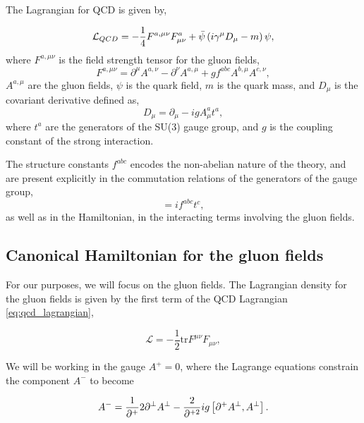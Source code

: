 \documentclass[11pt,a4paper,twoside,pdf]{article}
\numberwithin{equation}{section}
\begin{document}
The Lagrangian for QCD is given by,

\begin{equation}
    \mathcal{L}_{QCD} = -\frac{1}{4} F^{a,\mu\nu} F^a_{\mu\nu} + \bar{\psi}
    \left( i\gamma^\mu D_\mu - m \right) \psi,
\label{eq:qcd_lagrangian}
\end{equation}
where \( F^{a,\mu\nu} \) is the field strength tensor for the gluon fields,
\begin{equation}
    F^{a,\mu\nu} = \partial^\mu A^{a,\nu} - \partial^\nu A^{a,\mu} + g f^{abc} A^{b,\mu} A^{c,\nu},
\end{equation}
\( A^{a,\mu} \) are the gluon fields, \( \psi \) is the quark field, \( m \) is the quark mass,
and \( D_\mu \) is the covariant derivative defined as,
\begin{equation}
    D_\mu = \partial_\mu - ig A^a_\mu t^a,
\end{equation}
where \( t^a \) are the generators of the SU(3) gauge group, and \( g \) is the
coupling constant of the strong interaction.

The structure constants \( f^{abc} \) encodes the non-abelian nature of the
theory, and are present explicitly in the commutation relations of the
generators of the gauge group,
\begin{equation}
    [t^a, t^b] = i f^{abc} t^c,
\end{equation}
as well as in the Hamiltonian, in the interacting terms involving the gluon fields.

\subsection{Canonical Hamiltonian for the gluon fields}

For our purposes, we will focus on the gluon fields. The Lagrangian density for 
the gluon fields is given by the first term of the QCD Lagrangian \eqref{eq:qcd_lagrangian},

\begin{equation}
    \mathcal{L} = -\frac{1}{2}\text{tr}F^{\mu\nu}F_{\mu\nu},
\end{equation}

We will be working in the gauge $A^+=0$, where the Lagrange equations constrain
the component $A^-$ to become 

\begin{equation}
    A^- = \frac{1}{\partial^+}2 \partial^\perp A^\perp - \frac{2}{\partial^{+2}} ig 
    \left[ \partial^+ A^\perp, A^\perp \right].
\end{equation}
\end{document}
